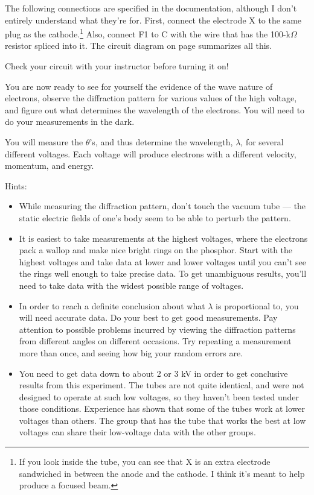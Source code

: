 The following connections are specified in the documentation,
although I don't entirely understand what they're for.
First, connect the electrode X to the same plug as the
cathode.\footnote{If you look inside the tube, you can see
that X is an extra electrode sandwiched in between the anode
and the cathode. I think it's meant to help produce a focused
beam.}
Also, connect F1 to C with the wire that has the 100-k$\Omega$
resistor spliced into it. The circuit diagram on page \pageref{fig:mo-edf-circuit} summarizes
all this.

Check your circuit with your instructor before turning it on!


\observations

You are now ready to see for yourself the evidence of the
wave nature of electrons, observe the diffraction pattern
for various values of the high voltage, and figure out what
determines the wavelength of the electrons. You will need to
do your measurements in the dark.

You will measure the $\theta $'s, and thus determine the
wavelength, $\lambda $, for several different voltages. Each
voltage will produce electrons with a different velocity,
momentum, and energy.  

Hints:

\begin{itemize}
\item[] While measuring the diffraction pattern, don't touch the
vacuum tube --- the static electric fields of one's body
seem to be able to perturb the pattern.

\item[] It is easiest to take measurements at the highest
voltages, where the electrons pack a wallop and make nice
bright rings on the phosphor. Start with the highest
voltages and take data at lower and lower voltages until you
can't see the rings well enough to take precise data. To get
unambiguous results, you'll need to take data with the
widest possible range of voltages.

\item[] In order to reach a definite conclusion about what
$\lambda $ is proportional to, you will need accurate data.
Do your best to get good measurements. Pay attention to
possible problems incurred by viewing the diffraction
patterns from different angles on different occasions. Try
repeating a measurement more than once, and seeing how big
your random errors are.

\item[] You need to get data down to about 2 or 3 kV in order to
get conclusive results from this experiment. The tubes are not
quite identical, and were not designed to operate at such low
voltages, so they haven't been tested under those conditions.
Experience has shown that some of the tubes work at lower voltages
than others. The group that has the tube that works the best at
low voltages can share their low-voltage data with the other groups.
\end{itemize}

